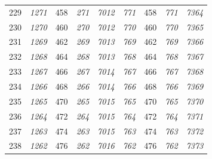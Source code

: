 \documentclass[10pt,fleqn]{article}
\begin{document}
\begin{longtable}{c|cccccccc}
229 & {\color{blue} \it 1271 \rm} & {\color{black} 458} & {\color{blue} \it 271 \rm} & {\color{blue} \it 7012 \rm} & {\color{blue} \it 771 \rm} & {\color{black} 458} & {\color{blue} \it 771 \rm} & {\color{blue} \it 7364 \rm} \\
230 & {\color{blue} \it 1270 \rm} & {\color{black} 460} & {\color{blue} \it 270 \rm} & {\color{blue} \it 7012 \rm} & {\color{blue} \it 770 \rm} & {\color{black} 460} & {\color{blue} \it 770 \rm} & {\color{blue} \it 7365 \rm} \\
231 & {\color{blue} \it 1269 \rm} & {\color{black} 462} & {\color{blue} \it 269 \rm} & {\color{blue} \it 7013 \rm} & {\color{blue} \it 769 \rm} & {\color{black} 462} & {\color{blue} \it 769 \rm} & {\color{blue} \it 7366 \rm} \\
232 & {\color{blue} \it 1268 \rm} & {\color{black} 464} & {\color{blue} \it 268 \rm} & {\color{blue} \it 7013 \rm} & {\color{blue} \it 768 \rm} & {\color{black} 464} & {\color{blue} \it 768 \rm} & {\color{blue} \it 7367 \rm} \\
233 & {\color{blue} \it 1267 \rm} & {\color{black} 466} & {\color{blue} \it 267 \rm} & {\color{blue} \it 7014 \rm} & {\color{blue} \it 767 \rm} & {\color{black} 466} & {\color{blue} \it 767 \rm} & {\color{blue} \it 7368 \rm} \\
234 & {\color{blue} \it 1266 \rm} & {\color{black} 468} & {\color{blue} \it 266 \rm} & {\color{blue} \it 7014 \rm} & {\color{blue} \it 766 \rm} & {\color{black} 468} & {\color{blue} \it 766 \rm} & {\color{blue} \it 7369 \rm} \\
235 & {\color{blue} \it 1265 \rm} & {\color{black} 470} & {\color{blue} \it 265 \rm} & {\color{blue} \it 7015 \rm} & {\color{blue} \it 765 \rm} & {\color{black} 470} & {\color{blue} \it 765 \rm} & {\color{blue} \it 7370 \rm} \\
236 & {\color{blue} \it 1264 \rm} & {\color{black} 472} & {\color{blue} \it 264 \rm} & {\color{blue} \it 7015 \rm} & {\color{blue} \it 764 \rm} & {\color{black} 472} & {\color{blue} \it 764 \rm} & {\color{blue} \it 7371 \rm} \\
237 & {\color{blue} \it 1263 \rm} & {\color{black} 474} & {\color{blue} \it 263 \rm} & {\color{blue} \it 7015 \rm} & {\color{blue} \it 763 \rm} & {\color{black} 474} & {\color{blue} \it 763 \rm} & {\color{blue} \it 7372 \rm} \\
238 & {\color{blue} \it 1262 \rm} & {\color{black} 476} & {\color{blue} \it 262 \rm} & {\color{blue} \it 7016 \rm} & {\color{blue} \it 762 \rm} & {\color{black} 476} & {\color{blue} \it 762 \rm} & {\color{blue} \it 7373 \rm} \\

\end{longtable}
\end{document}
